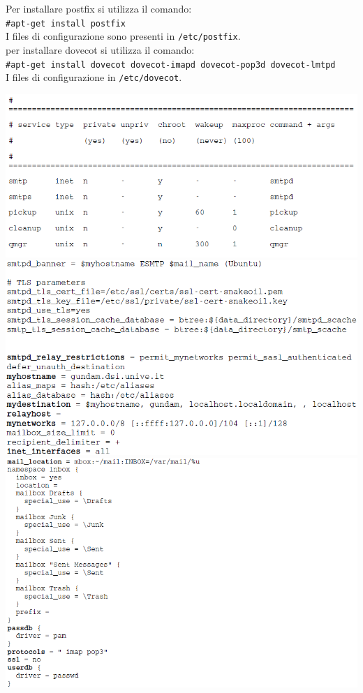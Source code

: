 \documentclass[a4paper]{report}
\newcommand\tab[1][1cm]{\hspace*{#1}}
\begin{document}
Per installare postfix si utilizza il comando:\\
\tab\texttt{\#apt-get install postfix}\\
I files di configurazione sono presenti in \texttt{/etc/postfix}.\\
per installare dovecot si utilizza il comando:\\
\tab\texttt{\#apt-get install dovecot dovecot-imapd dovecot-pop3d dovecot-lmtpd}\\
I files di configurazione in \texttt{/etc/dovecot}.\\
\begin{center}
\includegraphics[scale=0.5]{post1.png}\\
\includegraphics[scale=0.5]{post2.png}\\
\includegraphics[scale=0.5]{post3.png}
\end{center}
\end{document}
